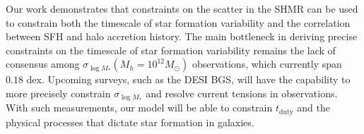 \documentclass[12pt, letterpaper, preprint, tighten]{aastex62}
\newcommand{\bitem}{\begin{itemize}}
\newcommand{\eitem}{\end{itemize}}
\begin{document}
Our work demonstrates that constraints on the scatter in the SHMR can be 
used to constrain both the timescale of star formation variability and 
the correlation between SFH and halo accretion history. The main 
bottleneck in deriving precise constraints on the timescale of star formation 
variability remains the lack of consensus among $\sigma_{\log M_*}(M_h=10^{12}M_\odot)$
observations, which currently span $0.18$ dex. Upcoming surveys, such as 
the DESI BGS, will have the capability to more precisely constrain
$\sigma_{\log M_*}$ and resolve current tensions in observations. With 
such measurements, our model will be able to constrain $t_\mathrm{duty}$ 
and the physical processes that dictate star formation in galaxies.


\end{document}
